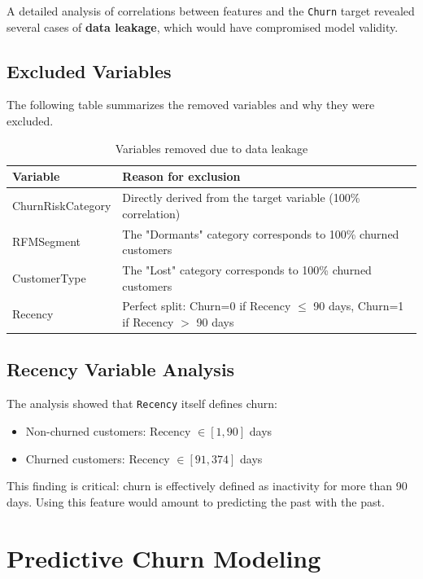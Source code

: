 \documentclass[12pt,a4paper]{article}
\begin{document}
A detailed analysis of correlations between features and the \texttt{Churn} target revealed several cases of \textbf{data leakage}, which would have compromised model validity.

\subsection{Excluded Variables}

The following table summarizes the removed variables and why they were excluded.

\begin{table}[H]
\centering
\begin{tabular}{L{3.5cm}L{9cm}}
\toprule
\textbf{Variable} & \textbf{Reason for exclusion} \\
\midrule
ChurnRiskCategory & Directly derived from the target variable (100\% correlation) \\
RFMSegment & The "Dormants" category corresponds to 100\% churned customers \\
CustomerType & The "Lost" category corresponds to 100\% churned customers \\
Recency & Perfect split: Churn=0 if Recency $\leq$ 90 days, Churn=1 if Recency $>$ 90 days \\
\bottomrule
\end{tabular}
\caption{Variables removed due to data leakage}
\end{table}

\subsection{Recency Variable Analysis}

The analysis showed that \texttt{Recency} itself defines churn:
\begin{itemize}
    \item Non-churned customers: Recency $\in [1, 90]$ days
    \item Churned customers: Recency $\in [91, 374]$ days
\end{itemize}

This finding is critical: churn is effectively defined as inactivity for more than 90 days. Using this feature would amount to predicting the past with the past.

\section{Predictive Churn Modeling}
\end{document}
